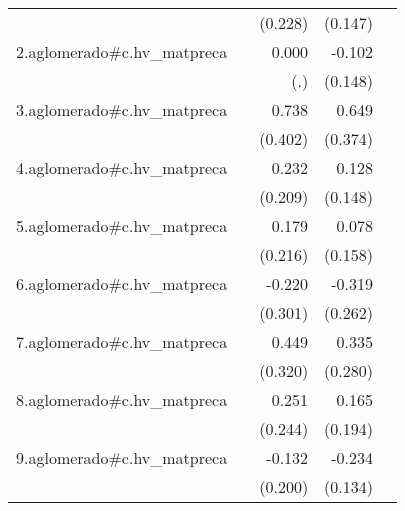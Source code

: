 {\begin{longtable}{l*{4}{D{.}{.}{-1}}}
            &                     &     (0.228)         &     (0.147)         &                     \\
\addlinespace
2.aglomerado#c.hv\_matpreca&                     &       0.000         &      -0.102         &                     \\
            &                     &         (.)         &     (0.148)         &                     \\
\addlinespace
3.aglomerado#c.hv\_matpreca&                     &       0.738         &       0.649         &                     \\
            &                     &     (0.402)         &     (0.374)         &                     \\
\addlinespace
4.aglomerado#c.hv\_matpreca&                     &       0.232         &       0.128         &                     \\
            &                     &     (0.209)         &     (0.148)         &                     \\
\addlinespace
5.aglomerado#c.hv\_matpreca&                     &       0.179         &       0.078         &                     \\
            &                     &     (0.216)         &     (0.158)         &                     \\
\addlinespace
6.aglomerado#c.hv\_matpreca&                     &      -0.220         &      -0.319         &                     \\
            &                     &     (0.301)         &     (0.262)         &                     \\
\addlinespace
7.aglomerado#c.hv\_matpreca&                     &       0.449         &       0.335         &                     \\
            &                     &     (0.320)         &     (0.280)         &                     \\
\addlinespace
8.aglomerado#c.hv\_matpreca&                     &       0.251         &       0.165         &                     \\
            &                     &     (0.244)         &     (0.194)         &                     \\
\addlinespace
9.aglomerado#c.hv\_matpreca&                     &      -0.132         &      -0.234         &                     \\
            &                     &     (0.200)         &     (0.134)         &                     \\

\end{longtable}}
